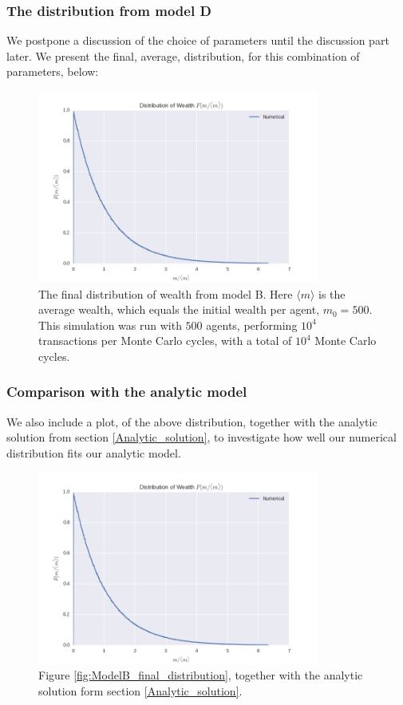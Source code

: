 \documentclass[a4paper, 10pt]{article}
\begin{document}
\subsubsection{The distribution from model D}
We postpone a discussion of the choice of parameters until the discussion part later. We present the final, average, distribution, for this combination of parameters, below:
\begin{figure}[!ht]
\centering
\includegraphics[height=2.5in]{distLamb0.png} %
\caption{The final distribution of wealth from model B. Here $\langle m \rangle$ is the average wealth, which equals the initial wealth per agent, $m_0=500$. This simulation was run with $500$ agents, performing $10^4$ transactions per Monte Carlo cycles, with a total of $10^4$ Monte Carlo cycles.}\label{fig:ModelD_final_distribution}
\end{figure}
\subsubsection{Comparison with the analytic model}
We also include a plot, of the above distribution, together with the analytic solution from section \ref{Analytic_solution}, to investigate how well our numerical distribution fits our analytic model.
\begin{figure}[!ht]
\centering
\includegraphics[height=2.5in]{distLamb0.png} %
\caption{Figure \ref{fig:ModelB_final_distribution}, together with the analytic solution form section \ref{Analytic_solution}.}\label{fig:ModelD_final_distribution_with_analytic}
\end{figure}
\end{document}
